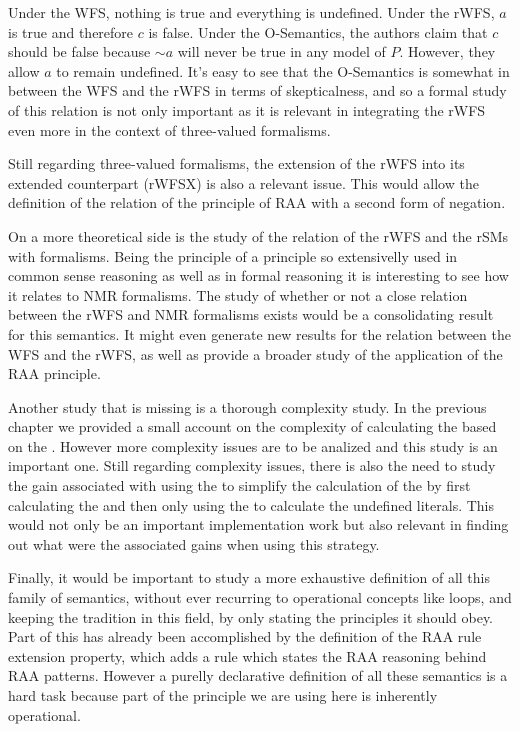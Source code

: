 Under the WFS, nothing is true and everything is undefined. Under the rWFS, $a$ is true and therefore $c$ is false. Under the O-Semantics, the authors claim that $c$ should be false because $\sim a$ will never be true in any model of $P$. However, they allow $a$ to remain undefined. It's easy to see that the O-Semantics is somewhat in between the WFS and the rWFS in terms of skepticalness, and so a formal study of this relation is not only important as it is relevant in integrating the rWFS even more in the context of three-valued formalisms.

Still regarding three-valued formalisms, the extension of the rWFS into its extended counterpart (rWFSX) is also a relevant issue. This would allow the definition of the relation of the principle of RAA with a second form of negation.

On a more theoretical side is the study of the relation of the rWFS and the rSMs with \nmr formalisms. Being the principle of \raa a principle so extensivelly used in common sense reasoning as well as in formal reasoning it is interesting to see how it relates to NMR formalisms. The study of whether or not a close relation between the rWFS and NMR formalisms exists would be a consolidating result for this semantics. It might even generate new results for the relation between the WFS and the rWFS, as well as provide a broader study of the application of the RAA principle.

Another study that is missing is a thorough complexity study. In the previous chapter we provided a small account on the complexity of calculating the \rwfm based on the \gro. However more complexity issues are to be analized and this study is an important one. Still regarding complexity issues, there is also the need to study the gain associated with using the \rwfs to simplify the calculation of the \rsms by first calculating the \rwfm and then only using the \rsms to calculate the undefined literals. This would not only be an important implementation work but also relevant in finding out what were the associated gains when using this strategy.

Finally, it would be important to study a more exhaustive definition of all this family of semantics, without ever recurring to operational concepts like loops, and keeping the tradition in this field, by only stating the principles it should obey. Part of this has already been accomplished by the definition of the RAA rule extension property, which adds a rule which states the RAA reasoning behind RAA patterns. However a purelly declarative definition of all these semantics is a hard task because part of the principle we are using here is inherently operational.

